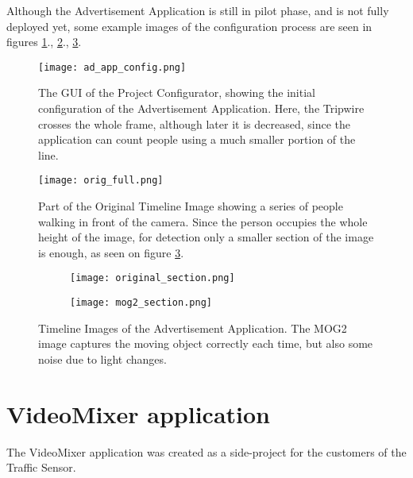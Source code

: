 Although the Advertisement Application is still in pilot phase, and is not fully deployed yet, some example images of the configuration process are seen in figures \ref{fig:adv_app_config}., \ref{fig:adv_app_full_orig}., \ref{fig:adv_app_counting}.

\begin{figure}[!h]
	\centering
	\texttt{[image: ad\_app\_config.png]}
	
	\caption{The GUI of the Project Configurator, showing the initial configuration of the Advertisement Application. Here, the Tripwire crosses the whole frame, although later it is decreased, since the application can count people using a much smaller portion of the line.  \label{fig:adv_app_config}}
\end{figure}

\begin{figure}[!h]
	\centering
	\texttt{[image: orig\_full.png]}
	
	\caption{Part of the Original Timeline Image showing a series of people walking in front of the camera. Since the person occupies the whole height of the image, for detection only a smaller section of the image is enough, as seen on figure \ref{fig:adv_app_counting}.\label{fig:adv_app_full_orig}}
\end{figure}

\begin{figure}[!h]
	\centering
	\begin{subfigure}[t]{0.6\textwidth}
	\texttt{[image: original\_section.png]}
	\end{subfigure}
	\hfill
	\begin{subfigure}[t]{0.6\textwidth}
		\texttt{[image: mog2\_section.png]}
	\end{subfigure}

	\caption{Timeline Images of the Advertisement Application. The MOG2 image captures the moving object correctly each time, but also some noise due to light changes.\label{fig:adv_app_counting}}
\end{figure}

\clearpage\section{VideoMixer application}
The VideoMixer application was created as a side-project for the customers of the Traffic Sensor.

